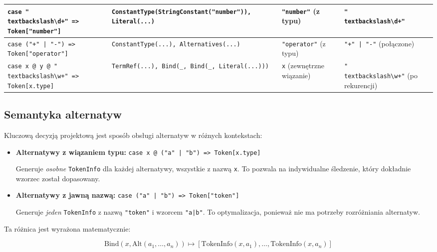 \begin{table}[htbp]
\begin{tabular}{|p{4cm}|p{4cm}|p{3cm}|p{2.5cm}|}
        \hline
        \texttt{case "\\textbackslash\textbackslash d+" => Token["number"]} &
        \texttt{ConstantType(StringConstant("number")), Literal(...)} &
        \texttt{"number"} (z typu) &
        \texttt{"\\textbackslash\textbackslash d+"} \\
        \hline
        \texttt{case ("+" | "-") => Token["operator"]} &
        \texttt{ConstantType(...), Alternatives(...)} &
        \texttt{"operator"} (z typu) &
        \texttt{"+" | "-"} (połączone) \\
        \hline
        \texttt{case x @ y @ "\\textbackslash\textbackslash w+" => Token[x.type]} &
        \texttt{TermRef(...), Bind(\_, Bind(\_, Literal(...)))} &
        \texttt{x} (zewnętrzne wiązanie) &
        \texttt{"\\textbackslash\textbackslash w+"} (po rekurencji) \\
        \hline
    \end{tabular}
\end{table}

\subsection{Semantyka alternatyw}
\label{subsec:cnp-alternatives-semantics}

Kluczową decyzją projektową jest sposób obsługi alternatyw w różnych kontekstach:

\begin{itemize}
    \item \textbf{Alternatywy z wiązaniem typu:} \texttt{case x @ ("a" | "b") => Token[x.type]}

    Generuje \textit{osobne} \texttt{TokenInfo} dla każdej alternatywy, wszystkie z nazwą \texttt{x}. To pozwala na indywidualne śledzenie, który dokładnie wzorzec został dopasowany.

    \item \textbf{Alternatywy z jawną nazwą:} \texttt{case ("a" | "b") => Token["token"]}

    Generuje \textit{jeden} \texttt{TokenInfo} z nazwą \texttt{"token"} i wzorcem \texttt{"a|b"}. To optymalizacja, ponieważ nie ma potrzeby rozróżniania alternatyw.
\end{itemize}

Ta różnica jest wyrażona matematycznie:

\begin{equation}
    \text{Bind}(x, \text{Alt}(a_1, \ldots, a_n)) \mapsto [\text{TokenInfo}(x, a_1), \ldots, \text{TokenInfo}(x, a_n)]
\end{equation}

